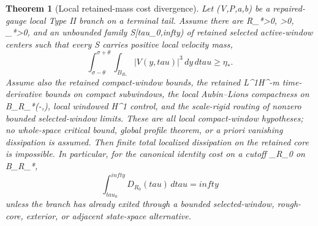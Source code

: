 \documentclass[11pt]{amsart}
\def\({}%
\def\){}%
\def\tilde#1{#1}%
\def\mathfrak#1{#1}%
\def\tau{tau}%
\def\infty{infty}%
\theoremstyle{plain}
\newtheorem{theorem}{Theorem}[section]
\theoremstyle{definition}
\theoremstyle{remark}
\begin{document}
\begin{theorem}[Local retained-mass cost divergence]
\label{thm:c3-local-retained-mass-cost-divergence}
Let \((V,P,a,b)\) be a repaired-gauge local Type II branch on a terminal tail.
Assume there are \(R_*>0\), \(\theta>0\), \(\eta_*>0\), and an unbounded family
\(\mathcal S\subset[\tau_0,\infty)\) of retained selected active-window centers
such that every \(\sigma\in\mathcal S\) carries positive local velocity mass,
\[
  \int_{\sigma-\theta}^{\sigma+\theta}\int_{B_{R_*}}|V(y,\tau)|^3\,dy\,d\tau
  \ge \eta_* .
\]
Assume also the retained compact-window bounds, the retained
\(L^1H^{-m}\) time-derivative bounds on compact subwindows, the local
Aubin--Lions compactness on \(B_{R_*}\times(-\theta,\theta)\), local windowed
\(H^1\) control, and the scale-rigid routing of nonzero bounded
selected-window limits.  These are all local compact-window hypotheses; no
whole-space critical bound, global profile theorem, or a priori vanishing
dissipation is assumed.  Then finite total localized dissipation on the
retained core is impossible.  In particular, for the canonical identity cost on
a cutoff \(\phi_{R_0}\) on \(B_{R_*}\),
\[
  \int_{\tau_0}^{\infty}\tilde{\mathfrak D}_{R_0}(\tau)\,d\tau=\infty
\]
unless the branch has already exited through a bounded selected-window,
rough-core, exterior, or adjacent state-space alternative.
\end{theorem}
\end{document}
